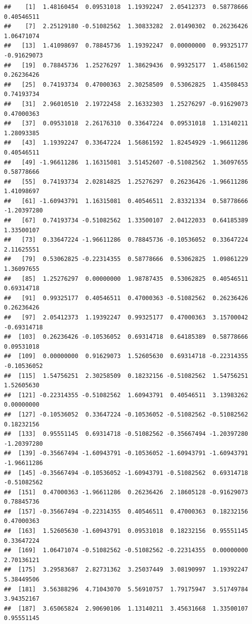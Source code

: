 \documentclass[
]{article}
\begin{document}
\begin{verbatim}
##    [1]  1.48160454  0.09531018  1.19392247  2.05412373  0.58778666  0.40546511
##    [7]  2.25129180 -0.51082562  1.30833282  2.01490302  0.26236426  1.06471074
##   [13]  1.41098697  0.78845736  1.19392247  0.00000000  0.99325177 -0.91629073
##   [19]  0.78845736  1.25276297  1.38629436  0.99325177  1.45861502  0.26236426
##   [25]  0.74193734  0.47000363  2.30258509  0.53062825  1.43508453  0.74193734
##   [31]  2.96010510  2.19722458  2.16332303  1.25276297 -0.91629073  0.47000363
##   [37]  0.09531018  2.26176310  0.33647224  0.09531018  1.13140211  1.28093385
##   [43]  1.19392247  0.33647224  1.56861592  1.82454929 -1.96611286  0.40546511
##   [49] -1.96611286  1.16315081  3.51452607 -0.51082562  1.36097655  0.58778666
##   [55]  0.74193734  2.02814825  1.25276297  0.26236426 -1.96611286  1.41098697
##   [61] -1.60943791  1.16315081  0.40546511  2.83321334  0.58778666 -1.20397280
##   [67]  0.74193734 -0.51082562  1.33500107  2.04122033  0.64185389  1.33500107
##   [73]  0.33647224 -1.96611286  0.78845736 -0.10536052  0.33647224  2.11625551
##   [79]  0.53062825 -0.22314355  0.58778666  0.53062825  1.09861229  1.36097655
##   [85]  1.25276297  0.00000000  1.98787435  0.53062825  0.40546511  0.69314718
##   [91]  0.99325177  0.40546511  0.47000363 -0.51082562  0.26236426  0.26236426
##   [97]  2.05412373  1.19392247  0.99325177  0.47000363  3.15700042 -0.69314718
##  [103]  0.26236426 -0.10536052  0.69314718  0.64185389  0.58778666  0.09531018
##  [109]  0.00000000  0.91629073  1.52605630  0.69314718 -0.22314355 -0.10536052
##  [115]  1.54756251  2.30258509  0.18232156 -0.51082562  1.54756251  1.52605630
##  [121] -0.22314355 -0.51082562  1.60943791  0.40546511  3.13983262  0.00000000
##  [127] -0.10536052  0.33647224 -0.10536052 -0.51082562 -0.51082562  0.18232156
##  [133]  0.95551145  0.69314718 -0.51082562 -0.35667494 -1.20397280 -1.20397280
##  [139] -0.35667494 -1.60943791 -0.10536052 -1.60943791 -1.60943791 -1.96611286
##  [145] -0.35667494 -0.10536052 -1.60943791 -0.51082562  0.69314718 -0.51082562
##  [151]  0.47000363 -1.96611286  0.26236426  2.18605128 -0.91629073  0.78845736
##  [157] -0.35667494 -0.22314355  0.40546511  0.47000363  0.18232156  0.47000363
##  [163]  1.52605630 -1.60943791  0.09531018  0.18232156  0.95551145  0.33647224
##  [169]  1.06471074 -0.51082562 -0.51082562 -0.22314355  0.00000000  2.70136121
##  [175]  3.29583687  2.82731362  3.25037449  3.08190997  1.19392247  5.38449506
##  [181]  3.56388296  4.71043070  5.56910757  1.79175947  3.51749784  3.94352167
##  [187]  3.65065824  2.90690106  1.13140211  3.45631668  1.33500107  0.95551145

\end{verbatim}
\end{document}
